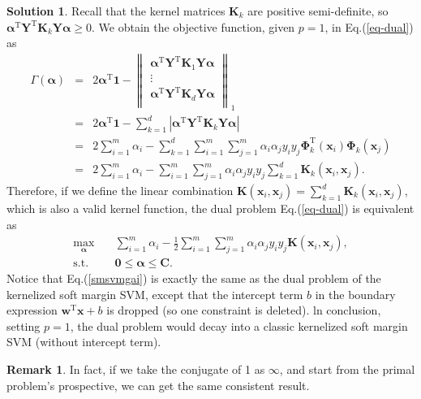 \documentclass[a4paper,UTF8]{article}
\numberwithin{equation}{section}
\theoremstyle{definition}
\newtheorem*{solution}{Solution}
\newtheorem*{Remark}{Remark}
\begin{document}
\begin{solution}
Recall that the kernel matrices $\bm{K}_k$ are positive semi-definite, so $ \bm\alpha^\mathrm{T}\bm{Y}^\mathrm{T} \bm{K}_k \bm{Y}\bm\alpha\geq 0$. We obtain the objective function, given $p=1$, in Eq.(\ref{eq-dual}) as
\begin{eqnarray}
\Gamma(\bm\alpha)&=&2\bm\alpha^\mathrm T \bm{1}- \left\lVert
\begin{matrix}
   \bm\alpha^\mathrm{T}\bm{Y}^\mathrm{T} \bm{K}_1 \bm{Y}\bm\alpha \\
   \vdots \\
   \bm\alpha^\mathrm{T}\bm{Y}^\mathrm{T} \bm{K}_d \bm{Y}\bm\alpha \\
  \end{matrix}\right\rVert_1\nonumber\\
 &=&2\bm\alpha^\mathrm T \bm{1}-\sum_{k=1}^d\left|\bm\alpha^\mathrm{T}\bm{Y}^\mathrm{T} \bm{K}_k \bm{Y}\bm\alpha\right|\nonumber\\
  &=&2\sum_{i=1}^m\alpha_i-\sum_{k=1}^d\sum_{i=1}^m\sum_{j=1}^m\alpha_i\alpha_jy_iy_j\bm{\Phi}_k^\mathrm{T}(\bm{x}_i)\bm{\Phi}_k(\bm{x}_j)\nonumber\\
&=&2\sum_{i=1}^m\alpha_i-\sum_{i=1}^m\sum_{j=1}^m\alpha_i\alpha_jy_iy_j\sum_{k=1}^d\bm{K}_k(\bm{x}_i,\bm{x}_j).
\end{eqnarray}
Therefore, if we define the linear combination $\bm{K}(\bm{x}_i,\bm{x}_j)=\sum_{k=1}^d\bm{K}_k(\bm{x}_i,\bm{x}_j)$, which is also a valid kernel function, the dual problem Eq.(\ref{eq-dual}) is equivalent as
\begin{equation}
\begin{split}
\max_{\bm{\alpha}} &\quad \sum_{i=1}^m\alpha_i-\frac{1}{2}\sum_{i=1}^m\sum_{j=1}^m\alpha_i\alpha_jy_iy_j\bm{K}(\bm{x}_i,\bm{x}_j),
\\
\text{s.t.} &\quad \bm{0}\leq\bm\alpha\leq\bm{C}.
\end{split}\label{smsvmgai}
\end{equation}
Notice that Eq.(\ref{smsvmgai}) is exactly the same as the dual problem of the kernelized soft margin SVM, except that the intercept term $b$ in the boundary expression $\bm{w}^\mathrm{T}\bm{x}+b$ is dropped (so one constraint is deleted). ln conclusion, setting $p=1$, the dual problem would decay into a classic kernelized soft margin SVM (without intercept term). 

\begin{Remark}
In fact, if we take the conjugate of 1 as $\infty$, and start from the primal problem's prospective, we can get the same consistent result.


\end{Remark}
\end{solution}
\end{document}
